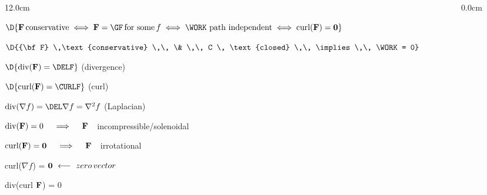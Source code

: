 \begin{frame}
\begin{columns}\begin{column}{12.0cm}

{}

\scriptsize

\vspace{0.5cm}

\OBUL $\D{{\bf F} \,\text{conservative} \iff {\bf F} = \GF \,\text{for some}\, f \iff \WORK \,\, \text{path independent} \iff \text{curl}({\bf F}) = {\bf 0}}$ 

\OBUL $\D{{\bf F} \,\text{conservative} \,\, \& \,\, C \, \text{closed} \,\, \implies \,\, \WORK = 0}$

\vspace{0.5cm}

\OBUL $\D{\text{div}({\bf F}) = \DELF }$ \quad (divergence)

\vspace{0.5cm}

\OBUL $\D{\text{curl}({\bf F}) = \CURLF }$ \quad (curl)

\vspace{0.5cm}

\OBUL $\text{div($\nabla f$)} = \DEL \nabla f = \nabla^2 f$ \quad (Laplacian)

\vspace{0.5cm}

\OBUL $\text{div(${\bf F}$)} = 0 \quad \implies \quad {\bf F}$ \,\, incompressible/solenoidal

\vspace{0.5cm}

\OBUL $\text{curl(${\bf F}$)} = {\bf 0} \quad \implies \quad {\bf F}$ \,\, irrotational

\vspace{0.5cm}

\OBUL curl($\nabla f$) = ${\bf 0} \,\, \longleftarrow \,\, zero \, vector$ 

\vspace{0.5cm}

\OBUL div(curl ${\bf F}$) = $0$

\vspace{2.0cm}

\end{column}\begin{column}{0.0cm}\end{column}\end{columns}
\end{frame}
